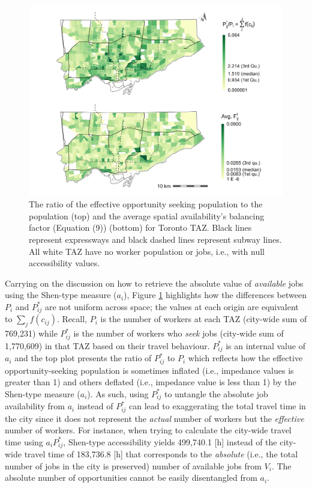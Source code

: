 \documentclass[10pt,letterpaper]{article}
\begin{document}
\begin{figure}
\includegraphics[width=1\linewidth]{images/internal-values-plot} \caption{\label{fig:internal-values-plot}  The ratio of the effective opportunity seeking population to the population (top) and the average spatial availability's balancing factor (Equation (9)) (bottom) for Toronto TAZ. Black lines represent expressways and black dashed lines represent subway lines. All white TAZ have no worker population or jobs, i.e., with null accessibility values.}\label{fig:internal-values-plot}
\end{figure}

Carrying on the discussion on how to retrieve the absolute value of
\emph{available} jobs using the Shen-type measure (\(a_i\)), Figure
\ref{fig:internal-values-plot} highlights how the differences between
\(P_i\) and \(P_{ij}^*\) are not uniform across space; the values at
each origin are equivalent to \(\sum_j f(c_{ij})\). Recall, \(P_i\) is
the number of workers at each TAZ (city-wide sum of 769,231) while
\(P_{ij}^*\) is the number of workers who \emph{seek} jobs (city-wide
sum of 1,770,609) in that TAZ based on their travel behaviour.
\(P_{ij}^*\) is an internal value of \(a_i\) and the top plot presents
the ratio of \(P_{ij}^*\) to \(P_i\) which reflects how the effective
opportunity-seeking population is sometimes inflated (i.e., impedance
values is greater than 1) and others deflated (i.e., impedance value is
less than 1) by the Shen-type measure (\(a_i\)). As such, using
\(P_{ij}^*\) to untangle the absolute job availability from \(a_i\)
instead of \(P_{ij}^*\) can lead to exaggerating the total travel time
in the city since it does not represent the \emph{actual} number of
workers but the \emph{effective} number of workers. For instance, when
trying to calculate the city-wide travel time using \(a_i P_{ij}^*\),
Shen-type accessibility yields 499,740.1 {[}h{]} instead of the
city-wide travel time of 183,736.8 {[}h{]} that corresponds to the
\emph{absolute} (i.e., the total number of jobs in the city is
preserved) number of available jobs from \(V_i\). The absolute number of
opportunities cannot be easily disentangled from \(a_i\).
\end{document}
